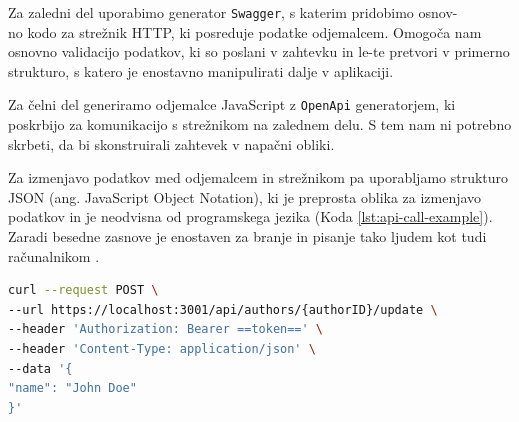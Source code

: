Za zaledni del uporabimo generator \verb=Swagger=, s katerim pridobimo osnov-\\no kodo za strežnik HTTP, ki posreduje podatke odjemalcem. Omogoča nam osnovno validacijo podatkov, ki so poslani v zahtevku in le-te pretvori v primerno strukturo, s katero je enostavno manipulirati dalje v aplikaciji.

Za čelni del generiramo odjemalce JavaScript z \verb=OpenApi= generatorjem, ki poskrbijo za komunikacijo s strežnikom na zalednem delu. S tem nam ni potrebno skrbeti, da bi skonstruirali zahtevek v napačni obliki.

Za izmenjavo podatkov med odjemalcem in strežnikom pa uporabljamo strukturo JSON (ang. JavaScript Object Notation), ki je preprosta oblika za izmenjavo podatkov in je neodvisna od programskega jezika (Koda \ref{lst:api-call-example}). Zaradi besedne zasnove je enostaven za branje in pisanje tako ljudem kot tudi računalnikom \cite{json-rfc}.

\clearpage

\begin{lstlisting}[language=bash, style=mystyle,caption={Primer izvedbe API klica.},label=lst:api-call-example]
curl --request POST \
--url https://localhost:3001/api/authors/{authorID}/update \
--header 'Authorization: Bearer ==token==' \
--header 'Content-Type: application/json' \
--data '{
"name": "John Doe"
}'
\end{lstlisting}

